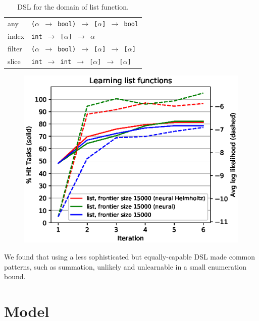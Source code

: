 \documentclass{article}
\begin{document}
\begin{table}
\begin{tabular}{| l | l |}
    any & \texttt{($\alpha$ $\rightarrow$ bool) $\rightarrow$ [$\alpha$] $\rightarrow$ bool} \\
    index & \texttt{int $\rightarrow$ [$\alpha$] $\rightarrow$ $\alpha$} \\
    filter & \texttt{($\alpha$ $\rightarrow$ bool) $\rightarrow$ [$\alpha$] $\rightarrow$ [$\alpha$]} \\
    slice & \texttt{int $\rightarrow$ int $\rightarrow$ [$\alpha$] $\rightarrow$ [$\alpha$]} \\
  \hline
\end{tabular}
\caption{DSL for the domain of list function.}
\label{listdsl}
\end{table}

\begin{figure}
  \includegraphics[width=\columnwidth]{figures/list.eps}
\end{figure}

We found that using a less sophisticated but equally-capable DSL made common
patterns, such as summation, unlikely and unlearnable in a small enumeration
bound.

\section{Model}












\end{document}

